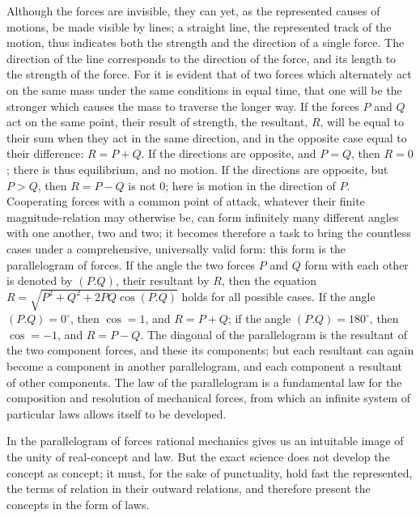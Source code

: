\documentclass[12pt]{book}
\begin{document}
Although the forces are invisible, they can yet, as the represented causes of
motions, be made visible by lines; a straight line, the represented track of the
motion, thus indicates both the strength and the direction of a single force. The
direction of the line corresponds to the direction of the force, and its length to
the strength of the force. For it is evident that of two forces which alternately
act on the same mass under the same conditions in equal time, that one will be the
stronger which causes the mass to traverse the longer way. If the forces $P$ and
$Q$ act on the same point, their result of strength, the resultant, $R$, will be
equal to their sum when they act in the same direction, and in the opposite case
equal to their difference: $R = P + Q$. If the directions are opposite, and $P =
Q$, then $R = 0$; there is thus equilibrium, and no motion. If the directions are
opposite, but $P > Q$, then $R = P - Q$ is not $0$; here is motion in the
direction of $P$. Cooperating forces with a common point of attack, whatever their
finite magnitude-relation may otherwise be, can form infinitely many different
angles with one another, two and two; it becomes therefore a task to bring the
countless cases under a comprehensive, universally valid form: this form is the
parallelogram of forces. If the angle the two forces $P$ and $Q$ form with each
other is denoted by $(P.Q)$, their resultant by $R$, then the equation $R =
\sqrt{P^2 + Q^2 + 2PQ\cos(P.Q)}$ holds for all possible cases. If the angle $(P.Q)
= 0^\circ$, then $\cos = 1$, and $R = P + Q$; if the angle $(P.Q) = 180^\circ$,
then $\cos = -1$, and $R = P - Q$. The diagonal of the parallelogram is the
resultant of the two component forces, and these its components; but each resultant
can again become a component in another parallelogram, and each component a
resultant of other components. The law of the parallelogram is a fundamental law
for the composition and resolution of mechanical forces, from which an infinite
system of particular laws allows itself to be developed.

In the parallelogram of forces rational mechanics gives us an intuitable image of
the unity of real-concept and law. But the exact science does not develop the
concept as concept; it must, for the sake of punctuality, hold fast the
represented, the terms of relation in their outward relations, and therefore
present the concepts in the form of laws.
\end{document}
